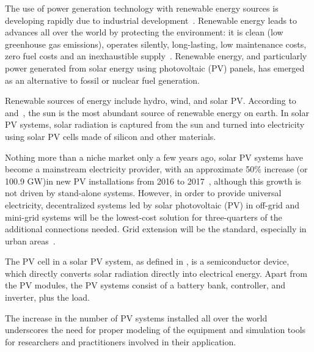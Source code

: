 The use of power generation technology with renewable energy sources is developing rapidly due to industrial development~\cite{Yatimi}. Renewable energy leads to advances all over the world by protecting the environment: it is clean (low greenhouse gas emissions), operates silently, long-lasting, low maintenance costs, zero fuel costs and an inexhaustible supply~\cite{Noroozian}. Renewable energy, and particularly power generated from solar energy using photovoltaic (PV) panels, has emerged as an alternative to fossil or nuclear fuel generation. 

Renewable sources of energy include hydro, wind, and solar PV. According to~\cite{SEIA} and~\cite{Chauhan}, the sun is the most abundant source of renewable energy on earth. In solar PV systems, solar radiation is captured from the sun and turned into electricity using solar PV cells made of silicon and other materials.

Nothing more than a niche market only a few years ago, solar PV systems have become a mainstream electricity provider, with an approximate 50\% increase (or 100.9 GW)in new PV installations from 2016 to 2017~\cite{EPIA}, although this growth is not driven by stand-alone systems. However, in order to provide universal electricity, decentralized systems led by solar photovoltaic (PV) in off-grid and mini-grid systems will be the lowest-cost solution for three-quarters of the additional connections needed. Grid extension will be the standard, especially in urban areas~\cite{IEAweo2018}.

The PV cell in a solar PV system, as defined in \cite{Rawat}, is a semiconductor device, which directly converts solar radiation directly into electrical energy. Apart from the PV modules, the PV systems consist of a battery bank, controller, and inverter, plus the load.
%
%

The increase in the number of PV systems installed all over the world underscores the need for proper modeling of the equipment and simulation tools for researchers and practitioners involved in their application. 

